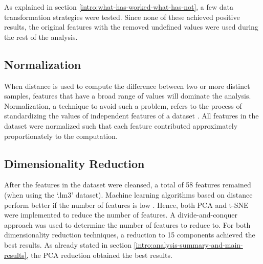 As explained in section \ref{intro:what-has-worked-what-has-not}, a few data transformation strategies were tested. Since none of these achieved positive results, the original features with the removed undefined values were used during the rest of the analysis.

\subsection{Normalization}

When distance is used to compute the difference between two or more distinct samples, features that have a broad range of values will dominate the analysis. Normalization, a technique to avoid such a problem, refers to the process of standardizing the values of independent features of a dataset \cite{data-mining-intro}. All features in the dataset were normalized such that each feature contributed approximately proportionately to the computation.

\subsection{Dimensionality Reduction}

After the features in the dataset were cleansed, a total of 58 features remained (when using the `.lm3' dataset). Machine learning algorithms based on distance perform better if the number of features is low \cite{data-mining-intro}. Hence, both PCA and t-SNE were implemented to reduce the number of features.
A divide-and-conquer approach was used to determine the number of features to reduce to. For both dimensionality reduction techniques, a reduction to 15 components achieved the best results. As already stated in section \ref{intro:analysis-summary-and-main-results}, the PCA reduction obtained the best results.
